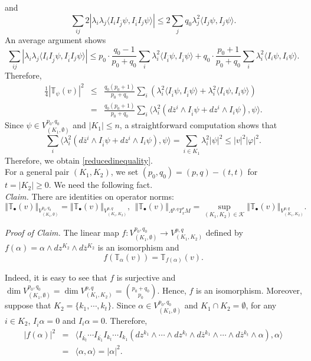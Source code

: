 \documentclass[12pt, reqno]{amsart}
\theoremstyle{plain}
\theoremstyle{definition}
\renewcommand{\bar}{\overline}
\renewcommand{\phi}{\varphi}
\newcommand{\beq}{\begin{equation}}
\newcommand{\eeq}{\end{equation}}
\newcommand{\ee}{\end{eqnarray*}}
\newcommand{\be}{\begin{eqnarray*}}
\renewcommand{\>}{\rightarrow}
\renewcommand{\#}{\sharp}
\newcommand{\nm}[1]{\left\Vert #1\right\Vert}
\numberwithin{equation}{section} %
\begin{document}
and
\beq \sum_{ij} 2|\lambda_{i} \lambda_{j} \langle I_i I_{\bar j} \psi, I_{\bar i} I_j \psi \rangle |  \leq 2\sum_j q_0\lambda_{j}^2 \langle I_j \psi, I_j \psi \rangle.\eeq
An average argument shows
\beq\sum_{ij} |\lambda_{i} \lambda_{j} \langle I_i I_{\bar j} \psi, I_{\bar i} I_j \psi \rangle | \leq p_0\cdot \frac{q_0-1}{p_0+q_0}\sum_i \lambda_{i}^2 \langle I_{\bar i} \psi, I_{\bar i} \psi \rangle +q_0\cdot  \frac{p_0+1}{p_0+q_0}\sum_i \lambda_{i}^2 \langle I_i \psi, I_i \psi \rangle. \eeq
Therefore,
\be  \frac{1}{4} |\mathbb T_\psi(v) |^2
& \leq & \frac{q_0(p_0+1)}{p_0+q_0} \sum_i\left( \lambda_{i}^2 \langle I_{\bar i} \psi, I_{\bar i} \psi \rangle + \lambda_{i}^2 \langle I_i \psi, I_i \psi \rangle \right) \\
& = & \frac{q_0(p_0+1)}{p_0+q_0} \sum_i \langle \lambda_{i}^2 (d\bar z{}^i \wedge I_{\bar i} \psi + dz^i \wedge I_i \psi), \psi \rangle. \ee
Since  $ \psi \in V^{p_0,q_0}_{(K_1,\emptyset)} $ and $|K_1|\leq n$,  a straightforward computation shows that
\beq \sum_i \langle \lambda_{i}^2 (d\bar z{}^i \wedge I_{\bar i} \psi + dz^i \wedge I_i \psi), \psi \rangle= \sum_{i \in K_1} \lambda_{i}^2 |\psi|^2\leq |v|^2|\phi|^2. \eeq
Therefore, we obtain \eqref{reducedinequality}. \\



\noindent For a general pair $  (K_1,K_2) $,  we set $ (p_0,q_0) = (p,q) - (t,t) $ for $ t = |K_2| \geq 0 $. We need the following fact.\\

\noindent \emph{Claim.} There are  identities on operator norms:
\beq \nm{\mathbb T_\bullet(v)}_{V^{p_0,q_0}_{(K_1,\emptyset)}}=\nm{\mathbb T_\bullet(v)}_{V^{p,q}_{(K_1,K_2)}},\ \  \nm{\mathbb T_\bullet(v)}_{\Lambda^{p,q}T_x^{*}M}= \sup_{(K_1,K_2) \in \mathscr{K}} \nm{\mathbb T_\bullet(v)}_{V^{p,q}_{(K_1,K_2)}}. \label{normidentity}\eeq



\noindent \emph{Proof of Claim.} The linear map $ f : V^{p_0,q_0}_{(K_1,\emptyset)} \> V^{p,q}_{(K_1,K_2)}$ defined by
$ f(\alpha) = \alpha \wedge dz^{K_2} \wedge d\bar z{}^{K_2}$
is an isomorphism and
$$ f\left(\mathbb T_{\alpha}(v)\right)=\mathbb T_{f(\alpha)}(v).$$

\noindent   Indeed, it is easy to see that $f$ is surjective and $ \dim V_{(K_1,\emptyset)}^{p_0,q_0} = \dim V_{(K_1,K_2)}^{p,q} = {p_0+q_0 \choose p_0} $.  Hence, $f$ is an isomorphism. Moreover, suppose that $ K_2 = \{ k_1, \cdots, k_t \} $.
Since $ \alpha \in V_{(K_1,\emptyset)}^{p_0,q_0} $ and $ K_1 \cap K_2 = \emptyset $, for any $ i \in K_2 $, $ I_{\bar i}\alpha = 0 $ and $ I_i \alpha = 0 $. Therefore,
\be |f(\alpha)|^2
& = & \langle I_{\bar{k_t}} \cdots I_{\bar{k_1}} I_{k_t} \cdots I_{k_1} \left(dz^{k_1} \wedge \cdots \wedge dz^{k_t} \wedge d\bar z{}^{k_1} \wedge \cdots \wedge d\bar z{}^{k_t} \wedge \alpha \right), \alpha \rangle \\
& = & \langle \alpha, \alpha \rangle = |\alpha|^2. \ee
\end{document}
